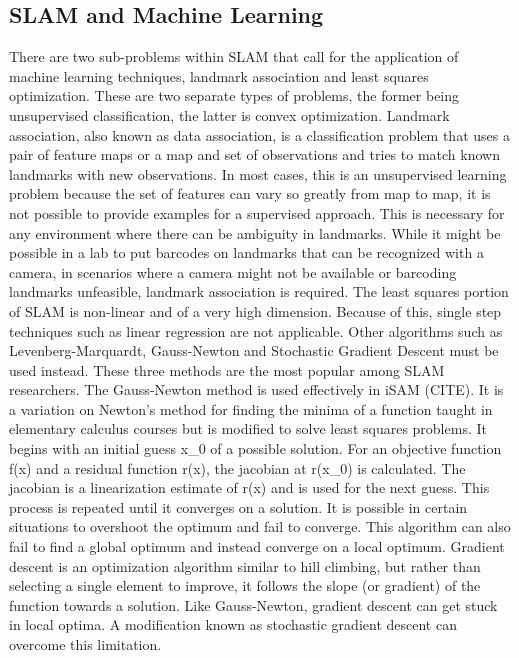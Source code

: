 \documentclass[12pt]{article}
\begin{document}
\subsection{SLAM and Machine Learning}
	There are two sub-problems within SLAM that call for the application of machine learning techniques, landmark association and least squares optimization.  These are two separate types of problems, the former being unsupervised classification, the latter is convex optimization.
Landmark association, also known as data association, is a classification problem that uses a pair of feature maps or a map and set of observations and tries to match known landmarks with new observations.  In most cases, this is an unsupervised learning problem because the set of features can vary so greatly from map to map, it is not possible to provide examples for a supervised approach.  This is necessary for any environment where there can be ambiguity in landmarks.  While it might be possible in a lab to put barcodes on landmarks that can be recognized with a camera, in scenarios where a camera might not be available or barcoding landmarks unfeasible, landmark association is required.
The least squares portion of SLAM is non-linear and of a very high dimension.  Because of this, single step techniques such as linear regression are not applicable.  Other algorithms such as Levenberg-Marquardt, Gauss-Newton and Stochastic Gradient Descent must be used instead.  These three methods are the most popular among SLAM researchers.  
	The Gauss-Newton method is used effectively in iSAM (CITE).  It is a variation on Newton’s method for finding the minima of a function taught in elementary calculus courses but is modified to solve least squares problems.  It begins with an initial guess x_0 of a possible solution.  For an objective function f(x) and a residual function r(x), the jacobian at r(x_0) is calculated.  The jacobian is a linearization estimate of r(x) and is used for the next guess.  This process is repeated until it converges on a solution.  It is possible in certain situations to overshoot the optimum and fail to converge.  This algorithm can also fail to find a global optimum and instead converge on a local optimum.
	Gradient descent is an optimization algorithm similar to hill climbing, but rather than selecting a single element to improve, it follows the slope (or gradient) of the function towards a solution.  Like Gauss-Newton, gradient descent can get stuck in local optima.  A modification known as stochastic gradient descent can overcome this limitation.  
\end{document}
